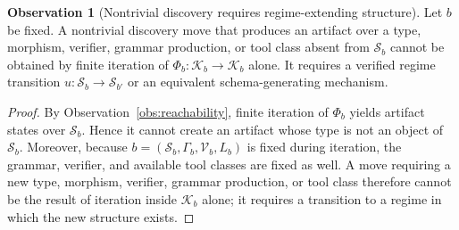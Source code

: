 \documentclass[11pt]{article}
\theoremstyle{definition}
\newtheorem{observation}[theorem]{Observation}
\newcommand{\K}{\mathcal{K}}
\newcommand{\Sschema}{\mathcal{S}}
\newcommand{\V}{\mathcal{V}}
\begin{document}
\begin{observation}[Nontrivial discovery requires regime-extending structure]
\label{obs:external}
Let $b$ be fixed. A nontrivial discovery move that produces an artifact over a type, morphism, verifier, grammar production, or tool class absent from $\Sschema_b$ cannot be obtained by finite iteration of $\Phi_b:\K_b\to\K_b$ alone. It requires a verified regime transition $u:\Sschema_b\to\Sschema_{b'}$ or an equivalent schema-generating mechanism.
\end{observation}

\begin{proof}
By Observation~\ref{obs:reachability}, finite iteration of $\Phi_b$ yields artifact states over $\Sschema_b$. Hence it cannot create an artifact whose type is not an object of $\Sschema_b$. Moreover, because $b=(\Sschema_b,\Gamma_b,\V_b,L_b)$ is fixed during iteration, the grammar, verifier, and available tool classes are fixed as well. A move requiring a new type, morphism, verifier, grammar production, or tool class therefore cannot be the result of iteration inside $\K_b$ alone; it requires a transition to a regime in which the new structure exists.
\end{proof}
\end{document}
